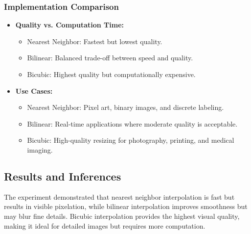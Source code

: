 \documentclass[12pt,a4paper]{article}
\begin{document}
\subsubsection{Implementation Comparison}
\begin{itemize}
  \item \textbf{Quality vs. Computation Time:}
    \begin{itemize}
      \item Nearest Neighbor: Fastest but lowest quality.
      \item Bilinear: Balanced trade-off between speed and quality.
      \item Bicubic: Highest quality but computationally expensive.
    \end{itemize}

  \item \textbf{Use Cases:}
    \begin{itemize}
      \item Nearest Neighbor: Pixel art, binary images, and discrete labeling.
      \item Bilinear: Real-time applications where moderate quality is acceptable.
      \item Bicubic: High-quality resizing for photography, printing, and medical imaging.
    \end{itemize}
\end{itemize}

\subsection{Results and Inferences}
The experiment demonstrated that nearest neighbor interpolation is fast but results in visible pixelation, while bilinear interpolation improves smoothness but may blur fine details. Bicubic interpolation provides the highest visual quality, making it ideal for detailed images but requires more computation.
\end{document}
